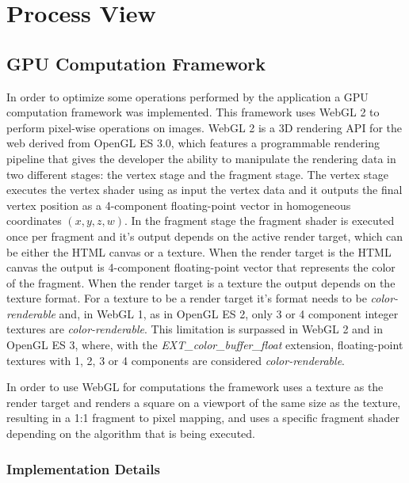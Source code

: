   \section {Process View}
    
    \subsection {GPU Computation Framework} \label{sec:software:process:gpu} %
    
      In order to optimize some operations performed by the application a GPU computation framework was implemented. This framework uses WebGL 2 to perform pixel-wise operations on images. WebGL 2 is a 3D rendering API for the web derived from OpenGL ES 3.0, which features a programmable rendering pipeline that gives the developer the ability to manipulate the rendering data in two different stages: the vertex stage and the fragment stage. The vertex stage executes the vertex shader using as input the vertex data and it outputs the final vertex position as a 4-component floating-point vector in homogeneous coordinates $(x, y, z, w)$. In the fragment stage the fragment shader is executed once per fragment and it's output depends on the active render target, which can be either the HTML canvas or a texture. When the render target is the HTML canvas the output is 4-component floating-point vector that represents the color of the fragment. When the render target is a texture the output depends on the texture format. For a texture to be a render target it's format needs to be \textit{color-renderable} and, in WebGL 1, as in OpenGL ES 2, only 3 or 4 component integer textures are \textit{color-renderable}. This limitation is surpassed in WebGL 2 and in OpenGL ES 3, where, with the \textit{EXT\_color\_buffer\_float} extension, floating-point textures with 1, 2, 3 or 4 components are considered \textit{color-renderable}.
      
      In order to use WebGL for computations the framework uses a texture as the render target and renders a square on a viewport of the same size as the texture, resulting in a 1:1 fragment to pixel mapping, and uses a specific fragment shader depending on the algorithm that is being executed. 
      
      \subsubsection{Implementation Details}
      

